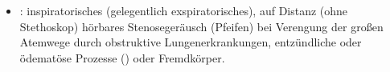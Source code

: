 {\begin{itemize}
  \begin{itemize}
    \item {} (eher Knistern)
    \item {} (Blubbern)
  \end{itemize}
  \item {}: inspiratorisches
  (gelegentlich exspiratorisches), auf Distanz (ohne Stethoskop)
  hörbares Stenosegeräusch (Pfeifen) bei Verengung der großen
  Atemwege durch obstruktive Lungenerkrankungen, entzündliche oder
  ödematöse Prozesse () oder Fremdkörper.
\end{itemize}
}{
\begin{PkuBefunde}[]
  \item[\SymbolPkuNormal] 
  \item[\SymbolFindingPathological] 
\end{PkuBefunde}
}{}{}{}

